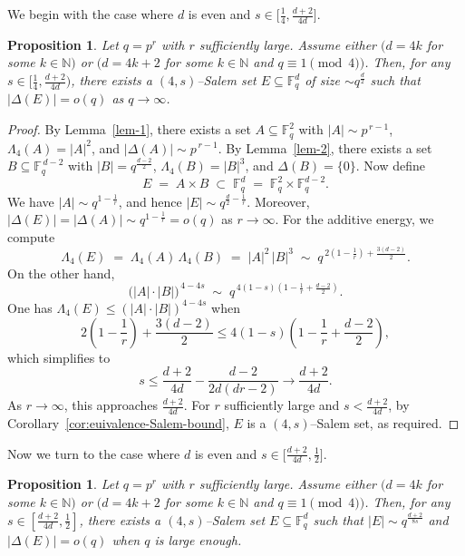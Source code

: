 \documentclass[11pt]{article}
\newtheorem{proposition}[theorem]{Proposition}
\begin{document}
We begin with the case where $d$ is even and $s \in \big[\tfrac{1}{4}, \tfrac{d+2}{4d}\big]$.
\begin{proposition}\label{cons1}
Let $q=p^r$ with $r$ sufficiently large. Assume either $(d = 4k$ for some $k \in \mathbb{N})$ or $(d = 4k + 2$ for some $k \in \mathbb{N}$ and $q \equiv 1 \pmod{4})$. Then, for any $s \in [\frac{1}{4}, \frac{d+2}{4d})$, there exists a $(4, s)$--Salem set $E \subseteq \mathbb{F}_q^d$ of size $\sim q^{\frac{d}{2}}$ such that $|\Delta(E)| = o(q)$ as $q \to \infty$.
\end{proposition}

\begin{proof}
By Lemma~\ref{lem-1}, there exists a set $A\subseteq\mathbb{F}_q^2$ with $|A|\sim p^{\,r-1}$, $\Lambda_4(A)=|A|^2$, and $|\Delta(A)|\sim p^{\,r-1}$. By  Lemma~\ref{lem-2}, there exists a set $B\subseteq\mathbb{F}_q^{\,d-2}$ with $|B|=q^{\frac{d-2}{2}}$, $\Lambda_4(B)=|B|^3$, and $\Delta(B)=\{0\}$. Now define
	\[
	E \;=\; A \times B 
	\;\subset\; \mathbb{F}_{q}^{d}
	\;=\; \mathbb{F}_{q}^{2} \times \mathbb{F}_{q}^{d-2}.
	\]
	We have $|A|\sim q^{1-\frac{1}{r}}$, and hence $|E|\sim q^{\frac{d}{2}-\frac{1}{r}}$. Moreover, $|\Delta(E)|=|\Delta(A)|\sim q^{1-\frac{1}{r}}= o(q)$ as $r \to \infty$. 
	For the additive energy, we compute
	\[
	\Lambda_4(E) 
	\;=\; \Lambda_4(A)\,\Lambda_4(B)
	\;=\; |A|^{2}\,|B|^{3}
	\;\sim\; q^{\,2(1-\frac{1}{r}) + \frac{3(d-2)}{2}}.
	\]
	On the other hand,
	\[
	\bigl(|A|\cdot|B|\bigr)^{\,4-4s}
	\;\sim\; q^{\,4(1-s)\!\left(1-\frac{1}{r} + \frac{d-2}{2}\right)}.
	\]
    One has $\Lambda_4(E)\le (|A| \cdot|B|)^{4-4s}$ when  
\[
2\left(1 - \frac{1}{r}\right) + \frac{3(d-2)}{2} \leq 4(1-s)\left(1 - \frac{1}{r} + \frac{d-2}{2}\right),
\]
which simplifies to
\[ s\le \frac{d+2}{4d}-\frac{d-2}{2d(dr-2)}\to \frac{d+2}{4d}.\]
As $r \to \infty$, this approaches $\frac{d+2}{4d}$. For $r$ sufficiently large and $s < \frac{d+2}{4d}$, by Corollary~\ref{cor:euivalence-Salem-bound}, $E$ is a $(4, s)$--Salem set, as required.
\end{proof}



Now we turn to the case where $d$ is even and $s \in \bigl[\tfrac{d+2}{4d}, \tfrac{1}{2}\bigr]$.
\begin{proposition}\label{cons2}
Let $q=p^r$ with $r$ sufficiently large. Assume either $(d = 4k$ for some $k \in \mathbb{N})$ or $(d = 4k + 2$ for some $k \in \mathbb{N}$ and $q \equiv 1 \pmod{4})$. Then, for any $s\in [\frac{d+2}{4d},\frac{1}{2}]$, there exists a $(4, s)$--Salem set $E\subseteq\mathbb{F}_q^d$ such that $|E|\sim q^{\frac{d+2}{8s}}$ and $|\Delta(E)|=o(q)$ when $q$ is large enough.
\end{proposition}
\end{document}
